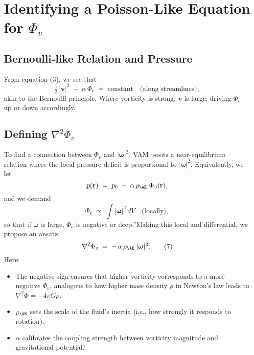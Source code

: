 \section{Identifying a Poisson-Like Equation for \(\Phi_v\)}

\subsection{Bernoulli-like Relation and Pressure}
From equation (3), we see that
\[
    \tfrac12\,|\mathbf{v}|^2
    \;-\;
    \alpha\,\Phi_v
    \;=\;
    \mathrm{constant}
    \quad
    \text{(along streamlines)},
\]
akin to the Bernoulli principle. Where vorticity is strong, \(\mathbf{v}\) is large, driving \(\Phi_v\) up or down accordingly.

\subsection{Defining \(\nabla^2 \Phi_v\)}
To find a connection between \(\Phi_v\) and \(|\boldsymbol{\omega}|^2\), VAM posits a near-equilibrium relation where the local pressure deficit is proportional to \(|\boldsymbol{\omega}|^2\). Equivalently, we let
\[
    p(\mathbf{r})
    \;=\;
    p_0
    \;-\;
    \alpha\,\rho_{\mathrm{\AE}}
    \;\Phi_v(\mathbf{r}),
\]
and we demand
\[
    \Phi_v
    \;\propto\;
    \int |\boldsymbol{\omega}|^2 \,dV
    \quad
    \text{(locally)},
\]
so that if \(\boldsymbol{\omega}\) is large, \(\Phi_v\) is negative or \grqq deep.\textquotedblright  Making this local and differential, we propose an ansatz:
\[
    \nabla^2 \Phi_v
    \;=\;
    -\,\alpha\,\rho_{\mathrm{\AE}}\;\lvert \boldsymbol{\omega}\rvert^2.
    \tag{7}
\]
Here:
\begin{itemize}
    \item The negative sign ensures that higher vorticity corresponds to a more negative \(\Phi_v\), analogous to how higher mass density \(\rho\) in Newton's law leads to \(\nabla^2 \Phi = -4\pi G\rho\).
    \item \(\rho_{\mathrm{\AE}}\) sets the scale of the fluid's inertia (i.e., how strongly it responds to rotation).
    \item \(\alpha\) calibrates the coupling strength between vorticity magnitude and \grqq gravitational potential.\textquotedblright
\end{itemize}

